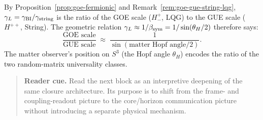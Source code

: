 \begin{remark}
\label{rem:dual-origin-goe-gue}
By Proposition~\ref{prop:goe-fermionic} and
Remark~\ref{rem:goe-gue-string-lqg},
$\gamma_L = \gamma_{\mathrm{BI}}/\gamma_{\mathrm{string}}$ is the ratio of the GOE scale ($H^+_-$, LQG) to
the GUE scale ($H^{++}$, String). The geometric relation $\gamma_L\approx
1/\beta_{\mathrm{sym}} = 1/\sin(\theta_H/2)$ therefore says:
\[
  \frac{\text{GOE scale}}{\text{GUE scale}}
  \;\approx\;
  \frac{1}{\sin(\text{matter Hopf angle}/2)}.
\]
The matter observer's position on $S^3$ (the Hopf angle $\theta_H$)
encodes the ratio of the two random-matrix universality classes.
\end{remark}

\begin{quote}\small
\noindent\textbf{Reader cue.} Read the next block as an interpretive deepening of the same closure architecture. Its purpose is to shift from the frame- and coupling-readout picture to the core/horizon communication picture without introducing a separate physical mechanism.
\end{quote}

